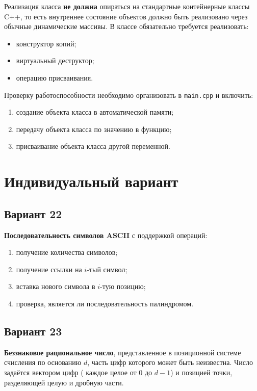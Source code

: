 \documentclass[a4paper, 14pt]{extarticle}
\begin{document}
Реализация класса \textbf{не должна} опираться на стандартные контейнерные классы C++, то есть внутреннее состояние объектов должно быть реализовано через обычные динамические массивы. В классе обязательно требуется реализовать:
\begin{itemize}[nosep]
    \item конструктор копий;
    \item виртуальный деструктор;
    \item операцию присваивания.
\end{itemize}

Проверку работоспособности необходимо организовать в \texttt{main.cpp} и включить:
\begin{enumerate}[nosep]
    \item создание объекта класса в автоматической памяти;
    \item передачу объекта класса по значению в функцию;
    \item присваивание объекта класса другой переменной.
\end{enumerate}

\section{Индивидуальный вариант}\label{Sect::variant}

\subsection*{Вариант 22}
\textbf{Последовательность символов ASCII} с поддержкой операций:
\begin{enumerate}[nosep]
    \item получение количества символов;
    \item получение ссылки на $i$-тый символ;
    \item вставка нового символа в $i$-тую позицию;
    \item проверка, является ли последовательность палиндромом.
\end{enumerate}

\subsection*{Вариант 23}
\textbf{Беззнаковое рациональное число}, представленное в позиционной системе счисления по основанию $d$, часть цифр которого может быть неизвестна. Число задаётся вектором цифр ( каждое целое от $0$ до $d-1$) и позицией точки, разделяющей целую и дробную части.
\end{document}
